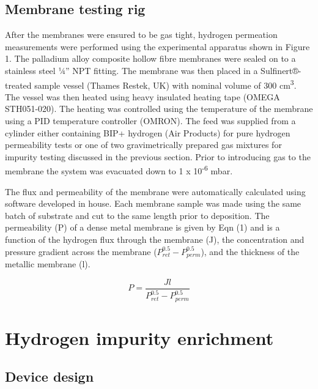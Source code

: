 \subsection{Membrane testing rig}
After the membranes were ensured to be gas tight, hydrogen permeation measurements were performed using the experimental apparatus shown in Figure 1. The palladium alloy composite hollow fibre membranes were sealed on to a stainless steel ¼” NPT fitting. The membrane was then placed in a Sulfinert®-treated sample vessel (Thames Restek, UK) with nominal volume of 300 cm\textsuperscript{3}. The vessel was then heated using heavy insulated heating tape (OMEGA STH051-020). The heating was controlled using the temperature of the membrane using a PID temperature controller (OMRON). The feed was supplied from a cylinder either containing BIP+ hydrogen (Air Products) for pure hydrogen permeability tests or one of two gravimetrically prepared gas mixtures for impurity testing discussed in the previous section. Prior to introducing gas to the membrane the system was evacuated down to 1 x 10\textsuperscript{-6} mbar.

The flux and permeability of the membrane were automatically calculated using software developed in house. Each membrane sample was made using the same batch of substrate and cut to the same length prior to deposition. The permeability (P)  of a dense metal membrane is given by Eqn (1) and is a function of the hydrogen flux through the membrane (J), the concentration and pressure gradient across the membrane ($P^{0.5}_{ret}-P^{0.5}_{perm}$), and the thickness of the metallic membrane (l). 

\begin{equation} \label{eq:1}
    P = \frac{J l}{P^{0.5}_{ret}-P^{0.5}_{perm}}
\end{equation}


\section{Hydrogen impurity enrichment}
\subsection{Device design}

\renewcommand{\bibname}{References}

